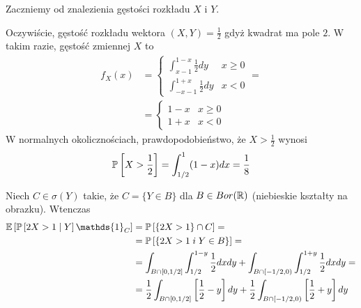 \begin{solution}
  Zaczniemy od znalezienia gęstości rozkładu $X$ i $Y$.


  Oczywiście, gęstość rozkładu wektora $(X, Y)=\frac{1}{2}$ gdyż kwadrat ma pole $2$. W takim razie, gęstość zmiennej $X$ to 
  \begin{align*}
    f_X(x)&=\begin{cases}\int_{x-1}^{1-x}\frac{1}{2}dy  & x \geq 0\\ \int^{1+x}_{-x-1}\frac{1}{2}dy & x<0\end{cases}=\\ 
          &= \begin{cases}1-x & x\geq 0\\ 1+x&x<0\end{cases}
  \end{align*}
  W normalnych okolicznościach, prawdopodobieństwo, że $X>\frac{1}{2}$ wynosi
  $$\prob{X>\frac{1}{2}}=\int_{1/2}^1(1-x)dx=\frac{1}{8}$$

  \begin{center}\end{center}

  Niech $C\in\sigma(Y)$ takie, że $C=\{Y\in B\}$ dla $B\in Bor(\operatorname{\mathbb{R}})$ (niebieskie kształty na obrazku). Wtenczas
  \begin{align*}
    \expected{\prob{2X>1}{Y}\mathds{1}_C}&=\prob{\{2X>1\}\cap C}=\\ 
                                         &=\prob{\{2X>1\;i\;Y\in B\}}=\\ 
                                         &=\int_{B\cap [0, 1/2]}\int_{1/2}^{1-y}\frac{1}{2}dxdy+\int_{B\cap[-1/2, 0)}\int_{1/2}^{1+y}\frac{1}{2}dxdy=\\ 
                                         &=\frac{1}{2}\int_{B\cap [0, 1/2]}\left[\frac{1}{2}-y\right]dy+\frac{1}{2}\int_{B\cap[-1/2, 0)}\left[{\frac{1}{2}+y}\right]dy
  \end{align*}


\end{solution}
